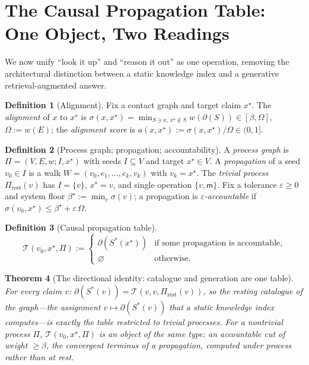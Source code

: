 \documentclass[11pt,twocolumn,a4paper]{article}
\theoremstyle{frathm}
\newtheorem{theorem}{Theorem}[section]
\theoremstyle{definition}
\newtheorem{definition}[theorem]{Definition}
\theoremstyle{remark}
\newcommand{\V}{V}
\newcommand{\E}{E}
\newcommand{\wt}{w}
\newcommand{\med}{\mathsf{m}}
\newcommand{\flo}{\beta}
\newcommand{\cut}{\partial}
\newcommand{\str}{\sigma}
\newcommand{\Tab}{\mathcal{T}}
\newcommand{\Proc}{\Pi}
\newcommand{\Walk}{W}
\newcommand{\Om}{\Omega}
\newcommand{\al}{a}
\newcommand{\eps}{\varepsilon}
\begin{document}
\section{The Causal Propagation Table: One Object, Two Readings}
\label{sec:table}

We now unify ``look it up'' and ``reason it out'' as one operation,
removing the architectural distinction between a static knowledge index
and a generative retrieval-augmented answer.

\begin{definition}[Alignment]
\label{def:alignment}
Fix a contact graph and target claim $x^{\star}$. The \emph{alignment} of
$x$ to $x^{\star}$ is $\str(x,x^{\star})=\min_{S\ni x,\,x^{\star}\notin S}
\wt(\cut(S))\in[\flo,\Om]$, $\Om:=\wt(\E)$; the \emph{alignment score} is
$\al(x,x^{\star}):=\str(x,x^{\star})/\Om\in(0,1]$.
\end{definition}

\begin{definition}[Process graph; propagation; accountability]
\label{def:process}
A \emph{process graph} is $\Proc=(\V,\E,\wt;I,x^{\star})$ with seeds
$I\subseteq\V$ and target $x^{\star}\in\V$. A \emph{propagation} of a seed
$v_0\in I$ is a walk $\Walk=(v_0,e_1,\dots,e_k,v_k)$ with $v_k=x^{\star}$.
The \emph{trivial process} $\Proc_{\mathrm{rest}}(v)$ has $I=\{v\}$,
$x^{\star}=v$, and single operation $\{v,\med\}$. Fix a tolerance
$\eps\ge0$ and system floor $\flo^{\star}:=\min_v\str(v)$; a propagation is
\emph{$\eps$-accountable} if $\str(v_0,x^{\star})\le\flo^{\star}+\eps\,\Om$.
\end{definition}

\begin{definition}[Causal propagation table]
\label{def:table}
\[
\Tab(v_0,x^{\star},\Proc):=
\begin{cases}
\cut(S^{\ast}(x^{\star})) & \text{if some propagation is accountable},\\
\varnothing & \text{otherwise.}
\end{cases}
\]
\end{definition}

\begin{theorem}[The directional identity: catalogue and generation are one
table]
\label{thm:catalogue-table}
For every claim $v$: $\cut(S^{\ast}(v))=\Tab(v,v,\Proc_{\mathrm{rest}}(v))$,
so the resting catalogue of the graph---the assignment $v\mapsto
\cut(S^{\ast}(v))$ that a static knowledge index computes---is exactly the
table restricted to trivial processes. For a nontrivial process $\Proc$,
$\Tab(v_0,x^{\star},\Proc)$ is an object of the \emph{same type}: an
accountable cut of weight $\ge\flo$, the convergent terminus of a
propagation, computed under process rather than at rest.
\end{theorem}
\end{document}
